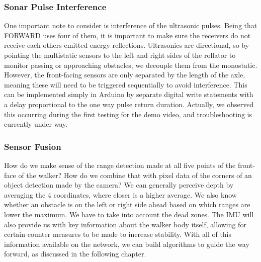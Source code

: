 \subsubsection{Sonar Pulse Interference}
\noindent One important note to consider is interference of the ultrasonic pulses. Being that FORWARD uses four of them, it is important to make sure the receivers do not receive each others emitted energy reflections. Ultrasonics are directional, so by pointing the multistatic sensors to the left and right sides of the rollator to monitor passing or approaching obstacles, we decouple them from the monostatic. However, the front-facing sensors are only separated by the length of the axle, meaning these will need to be triggered sequentially to avoid interference. This can be implemented simply in Arduino by separate digital write statements with a delay proportional to the one way pulse return duration. Actually, we observed this occurring during the first testing for the demo video, and troubleshooting is currently under way.\\

\subsubsection{Sensor Fusion}
\noindent How do we make sense of the range detection made at all five points of the front-face of the walker? How do we combine that with pixel data of the corners of an object detection made by the camera? We can generally perceive depth by averaging the 4 coordinates, where closer is a higher average. We also know whether an obstacle is on the left or right side ahead based on which ranges are lower the maximum. We have to take into account the dead zones. The IMU will also provide us with key information about the walker body itself, allowing for certain counter measures to be made to increase stability. With all of this information available on the network, we can build algorithms to guide the way forward, as discussed in the following chapter.\\

